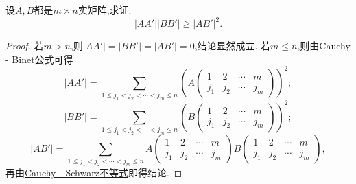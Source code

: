\documentclass[../../main.tex]{subfiles}
\begin{document}
\begin{example}
设\(A,B\)都是\(m\times n\)实矩阵,求证:
\[
|AA'||BB'|\geqslant |AB'|^2.
\]
\end{example}
\begin{proof}
若\(m > n\),则\(|AA'| = |BB'| = |AB'| = 0\),结论显然成立.
若\(m\leqslant  n\),则由Cauchy - Binet公式可得
\[
|AA'|=\sum_{1\leqslant  j_1<j_2<\cdots<j_m\leqslant  n}\left(A\begin{pmatrix}
1 & 2 & \cdots & m\\
j_1 & j_2 & \cdots & j_m
\end{pmatrix}\right)^2;
\]
\[
|BB'|=\sum_{1\leqslant  j_1<j_2<\cdots<j_m\leqslant  n}\left(B\begin{pmatrix}
1 & 2 & \cdots & m\\
j_1 & j_2 & \cdots & j_m
\end{pmatrix}\right)^2;
\]
\[
|AB'|=\sum_{1\leqslant  j_1<j_2<\cdots<j_m\leqslant  n}A\begin{pmatrix}
1 & 2 & \cdots & m\\
j_1 & j_2 & \cdots & j_m
\end{pmatrix}B\begin{pmatrix}
1 & 2 & \cdots & m\\
j_1 & j_2 & \cdots & j_m
\end{pmatrix},
\]
再由\hyperref[theorem:Cauchy - Schwarz不等式]{Cauchy - Schwarz不等式}即得结论.
\end{proof}
\end{document}
